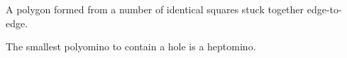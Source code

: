 A polygon formed from a number of identical squares stuck together edge-to-edge.
\par
The smallest polyomino to contain a hole is a heptomino.
